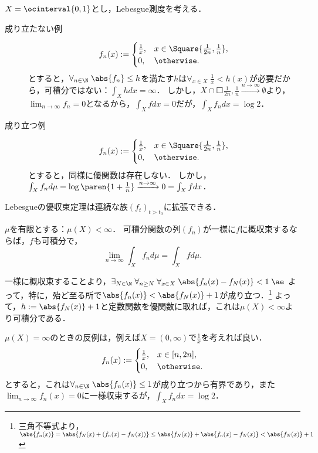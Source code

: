 \documentclass[uplatex, dvipdfmx]{jsreport}
\begin{document}
\begin{remark}[優関数が取れない場合は定理が成立することもしないこともある]
    $X=\ocinterval{0,1}$とし，Lebesgue測度を考える．
    \begin{description}
        \item[成り立たない例] \[f_n(x):=\begin{cases}
            \frac{1}{x},&x\in\Square{\frac{1}{2n},\frac{1}{n}},\\
            0,&\otherwise.
        \end{cases}\]とすると，$\forall_{n\in\N}\;\abs{f_n}\le h$を満たす$h$は$\forall_{x\in X}\;\frac{1}{x}<h(x)$が必要だから，可積分ではない：$\int_Xhdx=\infty$．
        しかし，$X\cap\Square{\frac{1}{2n},\frac{1}{n}}\xrightarrow{n\to\infty}\emptyset$より，$\lim_{n\to\infty}f_n=0$となるから，$\int_Xfdx=0$だが，$\int_Xf_ndx=\log 2$．
        \item[成り立つ例]
        \[f_n(x):=\begin{cases}
            \frac{1}{x},&x\in\Square{\frac{1}{2n},\frac{1}{n}},\\
            0,&\otherwise.
        \end{cases}\]とすると，同様に優関数は存在しない．
        しかし，$\int_Xf_nd\mu=\log\paren{1+\frac{1}{n}}\xrightarrow{n\to\infty}0=\int_Xfdx$．
    \end{description}
\end{remark}
\begin{remark}[微分と積分との交換に向けて]
    Lebesgueの優収束定理は連続な族$(f_t)_{t>t_0}$に拡張できる．
\end{remark}

\begin{corollary}[一様収束する可積分関数列の積分は収束する]
    $\mu$を有限とする：$\mu(X)<\infty$．
    可積分関数の列$(f_n)$が一様に$f$に概収束するならば，$f$も可積分で，
    \[\lim_{n\to\infty}\int_Xf_nd\mu=\int_Xfd\mu.\]
\end{corollary}
\begin{Proof}
    一様に概収束することより，$\exists_{N\in\N}\;\forall_{n\ge N}\;\forall_{x\in X}\;\abs{f_n(x)-f_N(x)}<1\;\ae$
    よって，特に，殆ど至る所で$\abs{f_n(x)}<\abs{f_N(x)}+1$が成り立つ．\footnote{三角不等式より，$\abs{f_n(x)}=\abs{f_N(x)+(f_n(x)-f_N(x))}\le\abs{f_N(x)}+\abs{f_n(x)-f_N(x)}<\abs{f_N(x)}+1$}
    よって，$h:=\abs{f_N(x)}+1$と定数関数を優関数に取れば，これは$\mu(X)<\infty$より可積分である．
\end{Proof}

\begin{remark}[測度が有限でない場合の反例]
    $\mu(X)=\infty$のときの反例は，例えば$X=(0,\infty)$で$\frac{1}{x}$を考えれば良い．
    \[f_n(x):=\begin{cases}
        \frac{1}{x},&x\in[n,2n],\\
        0,&\otherwise.
    \end{cases}\]とすると，これは$\forall_{n\in\N}\;\abs{f_n(x)}\le 1$が成り立つから有界であり，また$\lim_{n\to\infty}f_n(x)=0$に一様収束するが，$\int_Xf_ndx=\log 2$．
\end{remark}
\end{document}
